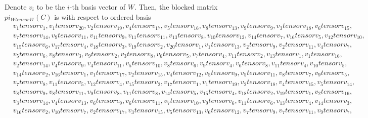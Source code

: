 \documentclass[10pt,a4paper]{amsart}
\numberwithin{equation}{section}
\theoremstyle{definition}
\def\pi{pi}
\def\otimes{ tensor }
\begin{document}
Denote $v_i$ to be the $i$-th basis vector of $W$. Then, the blocked matrix $\pi_{W \otimes W}(C)$ is with respect to ordered basis \label{appendix-basisWxW}
\begin{align*}
 &v_{1} \otimes v_{1},
v_{1} \otimes v_{20},
v_{2} \otimes v_{19},
v_{4} \otimes v_{17},
v_{5} \otimes v_{16},
v_{8} \otimes v_{13},
v_{9} \otimes v_{9},
v_{3} \otimes v_{18},
v_{6} \otimes v_{15}, \\
&v_{7} \otimes v_{14},
v_{9} \otimes v_{11},
v_{11} \otimes v_{9},
v_{11} \otimes v_{11},
v_{13} \otimes v_{8},
v_{10} \otimes v_{12},
v_{14} \otimes v_{7},
v_{16} \otimes v_{5},
v_{12} \otimes v_{10}, \\
&v_{15} \otimes v_{6},
v_{17} \otimes v_{4},
v_{18} \otimes v_{3},
v_{19} \otimes v_{2},
v_{20} \otimes v_{1},
v_{1} \otimes v_{13},
v_{2} \otimes v_{9},
v_{2} \otimes v_{11},
v_{4} \otimes v_{7}, \\
&v_{5} \otimes v_{6},
v_{8} \otimes v_{3},
v_{9} \otimes v_{2},
v_{3} \otimes v_{8},
v_{6} \otimes v_{5},
v_{7} \otimes v_{4},
v_{11} \otimes v_{2},
v_{13} \otimes v_{1},
v_{1} \otimes v_{16}, \\
&v_{2} \otimes v_{14},
v_{4} \otimes v_{9},
v_{4} \otimes v_{11},
v_{5} \otimes v_{10},
v_{8} \otimes v_{6},
v_{9} \otimes v_{4},
v_{6} \otimes v_{8},
v_{11} \otimes v_{4},
v_{10} \otimes v_{5}, \\
&v_{14} \otimes v_{2},
v_{16} \otimes v_{1},
v_{1} \otimes v_{17},
v_{2} \otimes v_{15},
v_{4} \otimes v_{12},
v_{5} \otimes v_{9},
v_{5} \otimes v_{11},
v_{8} \otimes v_{7},
v_{9} \otimes v_{5}, \\
&v_{7} \otimes v_{8},
v_{11} \otimes v_{5},
v_{12} \otimes v_{4},
v_{15} \otimes v_{2},
v_{17} \otimes v_{1},
v_{1} \otimes v_{19},
v_{2} \otimes v_{18},
v_{4} \otimes v_{15},
v_{5} \otimes v_{14}, \\
&v_{8} \otimes v_{9},
v_{8} \otimes v_{11},
v_{9} \otimes v_{8},
v_{11} \otimes v_{8},
v_{14} \otimes v_{5},
v_{15} \otimes v_{4},
v_{18} \otimes v_{2},
v_{19} \otimes v_{1},
v_{2} \otimes v_{16}, \\
&v_{3} \otimes v_{14},
v_{4} \otimes v_{13},
v_{6} \otimes v_{9},
v_{6} \otimes v_{11},
v_{7} \otimes v_{10},
v_{9} \otimes v_{6},
v_{11} \otimes v_{6},
v_{13} \otimes v_{4},
v_{14} \otimes v_{3}, \\
&v_{16} \otimes v_{2},
v_{10} \otimes v_{7},
v_{2} \otimes v_{17},
v_{3} \otimes v_{15},
v_{5} \otimes v_{13},
v_{6} \otimes v_{12},
v_{7} \otimes v_{9},
v_{7} \otimes v_{11},
v_{9} \otimes v_{7}, \\

\end{align*}
\end{document}
